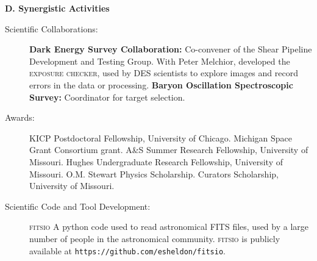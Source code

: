 \documentclass[10pt]{article}
\begin{document}
{\large \bf D. Synergistic Activities}
\begin{description}

    \item[Scientific Collaborations:] {\bf Dark Energy Survey Collaboration:}
        Co-convener of the Shear Pipeline Development and Testing Group. With
        Peter Melchior, developed
        the \textsc{exposure checker}, used by DES scientists to explore images
        and record errors in the data or processing.  {\bf
        Baryon Oscillation Spectroscopic Survey:} Coordinator for target
        selection.

    \item[Awards:] KICP Postdoctoral Fellowship, University of Chicago.  Michigan
        Space Grant Consortium grant. A\&S Summer Research Fellowship, University
        of Missouri.  Hughes Undergraduate Research Fellowship, University of
        Missouri. O.M. Stewart Physics Scholarship.  Curators Scholarship,
        University of Missouri.

    \item[Scientific Code and Tool Development:] \textsc{fitsio} A python code
        used to read astronomical FITS files, used by a large number of
        people in the astronomical community.  \textsc{fitsio} is publicly
        available at \verb+https://github.com/esheldon/fitsio+.

\end{description}

\end{document}
